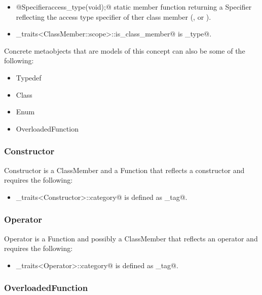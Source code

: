 \begin{itemize}
	\item{\verb@static @{\metaobject Specifier}\verb@ access_type(void);@} static member function returning
	a {\metaobject Specifier} reflecting the access type specifier of ther class member
	(\verb@private@, \verb@protected@ or \verb@public@).

	\item \verb@metaobject_traits<ClassMember::scope>::is_class_member@ is \verb@true_type@.
\end{itemize}

Concrete metaobjects that are models of this concept can also be some of the following:
\begin{itemize}
	\item{\metaobject Typedef}
	\item{\metaobject Class}
	\item{\metaobject Enum}
	\item{\metaobject OverloadedFunction}
\end{itemize}

\subsubsection{Constructor}

{\metaobject Constructor} is a {\metaobject ClassMember} and a {\metaobject Function} that
reflects a constructor and requires the following:

\begin{itemize}
	\item \verb@metaobject_traits<Constructor>::category@ is defined as  \verb@constructor_tag@.
\end{itemize}

\subsubsection{Operator}

{\metaobject Operator} is a {\metaobject Function} and possibly a {\metaobject ClassMember}
that reflects an operator and requires the following:

\begin{itemize}
	\item \verb@metaobject_traits<Operator>::category@ is defined as  \verb@operator_tag@.
\end{itemize}

\subsubsection{OverloadedFunction}

